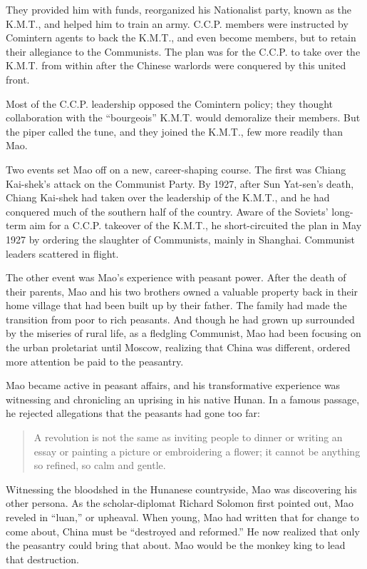They provided him with funds, reorganized his Nationalist party, known
as the K.M.T., and helped him to train an army. C.C.P. members were
instructed by Comintern agents to back the K.M.T., and even become
members, but to retain their allegiance to the Communists. The plan was
for the C.C.P. to take over the K.M.T. from within after the Chinese
warlords were conquered by this united front.

Most of the C.C.P. leadership opposed the Comintern policy; they thought
collaboration with the ``bourgeois'' K.M.T. would demoralize their
members. But the piper called the tune, and they joined the K.M.T., few
more readily than Mao.

Two events set Mao off on a new, career-shaping course. The first was
Chiang Kai-shek's attack on the Communist Party. By 1927, after Sun
Yat-sen's death, Chiang Kai-shek had taken over the leadership of the
K.M.T., and he had conquered much of the southern half of the country.
Aware of the Soviets' long-term aim for a C.C.P. takeover of the K.M.T.,
he short-circuited the plan in May 1927 by ordering the slaughter of
Communists, mainly in Shanghai. Communist leaders scattered in flight.

The other event was Mao's experience with peasant power. After the death
of their parents, Mao and his two brothers owned a valuable property
back in their home village that had been built up by their father. The
family had made the transition from poor to rich peasants. And though he
had grown up surrounded by the miseries of rural life, as a fledgling
Communist, Mao had been focusing on the urban proletariat until Moscow,
realizing that China was different, ordered more attention be paid to
the peasantry.

Mao became active in peasant affairs, and his transformative experience
was witnessing and chronicling an uprising in his native Hunan. In a
famous passage, he rejected allegations that the peasants had gone too
far:

\begin{quote}
A revolution is not the same as inviting people to dinner or writing an
essay or painting a picture or embroidering a flower; it cannot be
anything so refined, so calm and gentle.
\end{quote}

Witnessing the bloodshed in the Hunanese countryside, Mao was
discovering his other persona. As the scholar-diplomat Richard Solomon
first pointed out, Mao reveled in ``luan,'' or upheaval. When young, Mao
had written that for change to come about, China must be ``destroyed and
reformed.'' He now realized that only the peasantry could bring that
about. Mao would be the monkey king to lead that destruction.

